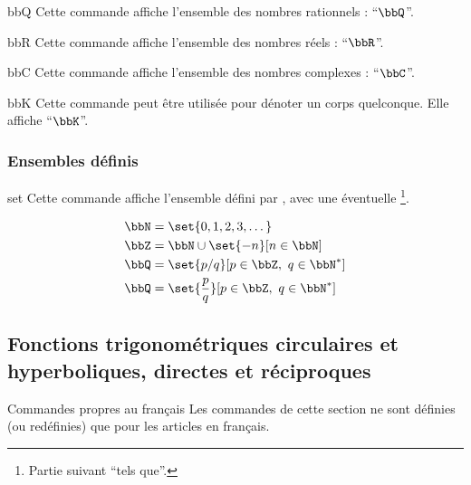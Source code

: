 \documentclass[french,nolocaltoc]{nwejmart}
\newtheorem[style=definition]{fait}
\newtheorem[title=contraventionnalisation]{ctrv}
\newtheorem[title-plural=anneaux]{anneau}
\newtheorem[title-plural=idéaux]{idéal}
\begin{document}
\begin{docCommand}{bbQ}{}
  Cette commande affiche l'ensemble des nombres rationnels : \enquote{$\bbQ$}.
\end{docCommand}

\begin{docCommand}{bbR}{}
  Cette commande affiche l'ensemble des nombres réels : \enquote{$\bbR$}.
\end{docCommand}

\begin{docCommand}{bbC}{}
  Cette commande affiche l'ensemble des nombres complexes : \enquote{$\bbC$}.
\end{docCommand}

\begin{docCommand}{bbK}{}
  Cette commande peut être utilisée pour dénoter un corps quelconque. Elle
  affiche \enquote{$\bbK$}.
\end{docCommand}

\subsubsection{Ensembles définis}

\begin{docCommand}[doc updated=2019-03-18]{set}{}
  Cette commande affiche l'ensemble défini par , avec une
  éventuelle \footnote{Partie suivant \enquote{tels
      que}.}.
\begin{bodycode}
\begin{align}
  \bbN & = \set{0,1,2,3,\dots}              \\
  \bbZ & = \bbN\cup\set{-n}[n\in\bbN]       \\
  \bbQ & = \set{p/q}[p\in\bbZ,\ q\in\bbN^*] \\
  \bbQ & = \set{\frac{p}{q}}[p\in\bbZ,\ q\in\bbN^*]
\end{align}
\end{bodycode}
\end{docCommand}

\subsection[Fonctions trigonométriques circulaires et hyperboliques]{Fonctions
  trigonométriques circulaires et hyperboliques, directes et réciproques}

\begin{dbremark}{Commandes propres au français}{}
  Les commandes de cette section ne sont définies (ou redéfinies) que pour les
  articles en français.
\end{dbremark}
\end{document}
